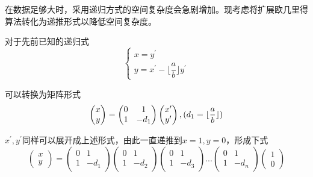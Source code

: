\documentclass[UTF8,a4paper,11pt]{ctexart}
\begin{document}
	\indent \;
	\par 在数据足够大时，采用递归方式的空间复杂度会急剧增加。现考虑将扩展欧几里得算法转化为递推形式以降低空间复杂度。
	\par 对于先前已知的递归式\\
	$$
		\left\{
			\begin{array}{lr}
			x=y^{\prime}\\
			y=x^{\prime}-\lfloor\dfrac{a}{b}\rfloor y^{\prime}
			\end{array}
		\right.
	$$
	\par 可以转换为矩阵形式\\
	$$
		\left(\begin{matrix}
		x\\
		y
		\end{matrix}\right)
		=
		\left(\begin{matrix}
		0 & 1\\
		1 & -d_{1}
		\end{matrix}\right)
		\left(\begin{matrix}
		x^{\prime}\\
		y^{\prime}
		\end{matrix}\right),
		\space (d_{1}=\lfloor\dfrac{a}{b}\rfloor)
	$$
	\par $x^{\prime},y^{\prime}$同样可以展开成上述形式，由此一直递推到$x=1,y=0$，形成下式\\

	$$  
		\left(\begin{matrix}x\\y\end{matrix}\right)
		=
		\left(\begin{matrix}0 & 1\\1 & -d_{1}\end{matrix}\right)
		\left(\begin{matrix}0 & 1\\1 & -d_{2}\end{matrix}\right)
		\left(\begin{matrix}0 & 1\\1 & -d_{3}\end{matrix}\right)
		...
		\left(\begin{matrix}0 & 1\\1 & -d_{n}\end{matrix}\right)
		\left(\begin{matrix}1\\0\end{matrix}\right)
	$$
\end{document}

